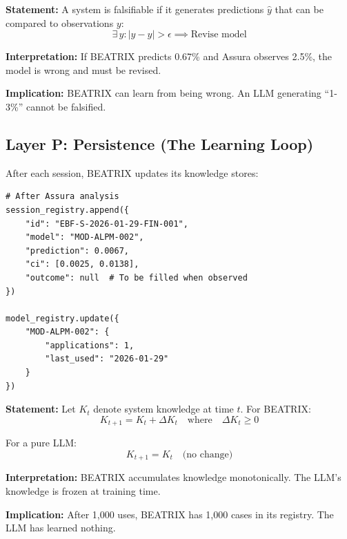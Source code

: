 \begin{tcolorbox}[colback=gray!5!white, colframe=gray!75!black,
    title=Axiom BX-3: Falsifiability]
\textbf{Statement:} A system is falsifiable if it generates predictions $\hat{y}$ that can be compared to observations $y$:
\begin{equation}
\exists \, y : |y - \hat{y}| > \epsilon \implies \text{Revise model}
\end{equation}

\textbf{Interpretation:} If BEATRIX predicts 0.67\% and Assura observes 2.5\%, the model is wrong and must be revised.

\textbf{Implication:} BEATRIX can learn from being wrong. An LLM generating ``1-3\%'' cannot be falsified.
\end{tcolorbox}


\subsection{Layer P: Persistence (The Learning Loop)}

After each session, BEATRIX updates its knowledge stores:

\begin{verbatim}
# After Assura analysis
session_registry.append({
    "id": "EBF-S-2026-01-29-FIN-001",
    "model": "MOD-ALPM-002",
    "prediction": 0.0067,
    "ci": [0.0025, 0.0138],
    "outcome": null  # To be filled when observed
})

model_registry.update({
    "MOD-ALPM-002": {
        "applications": 1,
        "last_used": "2026-01-29"
    }
})
\end{verbatim}

\begin{tcolorbox}[colback=gray!5!white, colframe=gray!75!black,
    title=Axiom BX-4: Cumulative Learning]
\textbf{Statement:} Let $K_t$ denote system knowledge at time $t$. For BEATRIX:
\begin{equation}
K_{t+1} = K_t + \Delta K_t \quad \text{where} \quad \Delta K_t \geq 0
\end{equation}

For a pure LLM:
\begin{equation}
K_{t+1} = K_t \quad \text{(no change)}
\end{equation}

\textbf{Interpretation:} BEATRIX accumulates knowledge monotonically. The LLM's knowledge is frozen at training time.

\textbf{Implication:} After 1,000 uses, BEATRIX has 1,000 cases in its registry. The LLM has learned nothing.
\end{tcolorbox}


